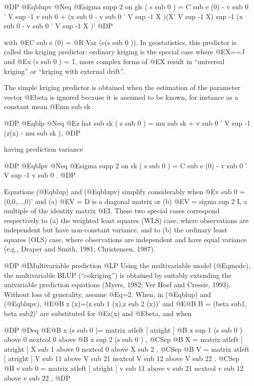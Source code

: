 \documentclass{article}
\begin{document}
@DP
@Eqblupv @Neq {@E{sigma supp 2 on gls ( s sub 0 ) = C sub e (0) - v sub
0 ' V sup -1 v sub 0 + (x sub 0 - v sub 0 ' V sup -1 X )(X' V sup -1 X)
sup -1 (x sub 0 - v sub 0 ' V sup -1 X )'}}
@DP

with @E{C sub e (0) = @R Var (e(s sub 0 ))}. In geostatistics, this
predictor is called the kriging predictor: ordinary kriging is the
special case where @E{X==J} and @E{x (s sub 0 ) = 1}, more complex forms
of @E{X} result in ``universal kriging'' or ``kriging with external
drift''.

The simple kriging predictor is obtained when the estimation of the
parameter vector @E{beta} is ignored because it is assumed to be known,
for instance as a constant mean @E{mu sub sk}

@DP
@Eqblp @Neq {@E{z hat sub sk ( s sub 0 ) = mu sub sk + v sub 0 ' V sup -1
(z(x) - mu sub sk ), }}
@DP

having prediction variance

@DP
@Eqblpv @Neq {@E{sigma supp 2 on sk ( s sub 0 ) = C sub e (0) - v sub 0
' V sup -1 v sub 0 }.}
@DP

Equations (@Eqblup) and (@Eqblupv) simplify considerably when @E{v sub
0 = (0,0,...,0)'} and (a) @E{V = D} is a diagonal matrix or (b) @E{V =
sigma sup 2 I}, a multiple of the identity matrix @E{I}. These two
special cases correspond respectively to (a) the weighted least squares
(WLS) case, where observations are independent but have non-constant
variance, and to (b) the ordinary least squares (OLS) case, where
observations are independent and have equal variance (e.g., Draper and
Smith, 1981; Christensen, 1987).

@DP
@I{Multivariable prediction}
@LP
Using the multivariable model (@Eqmodc), the multivariable BLUP
(``cokriging'') is obtained by suitably extending the univariable
prediction equations (Myers, 1982; Ver Hoef and Cressie, 1993). Without
loss of generality, assume @E{q=2}. When, in (@Eqblup) and (@Eqblupv),
@E{@B z (x)=(z sub 1 (x),z sub 2 (x))'} and @E{@B B = (beta sub{1},
beta sub{2})'} are substituted for @E{z(x)} and @E{beta}, and when

@DP
@Deq @E{@B x (s sub 0 )= matrix atleft { [ } atright { ] } {
 {@B x sup 1 (s sub 0 )} above 0
 nextcol
 0 above {@B x sup 2 (s sub 0 )}
}, @CSep
{@B X = matrix atleft { [ } atright { ] } {
 {X sub 1} above 0
 nextcol
 0 above {X sub 2}
}}, @CSep 
{@B V = matrix atleft { [ } atright { ] } {
 {V sub 11} above {V sub 21}
 nextcol
 {V sub 12} above {V sub 22}
}}, @CSep 
{@B v sub 0 = matrix atleft { [ } atright { ] } {
 {v sub 11} above {v sub 21}
 nextcol
 {v sub 12} above {v sub 22}
}}},
@DP
\end{document}
